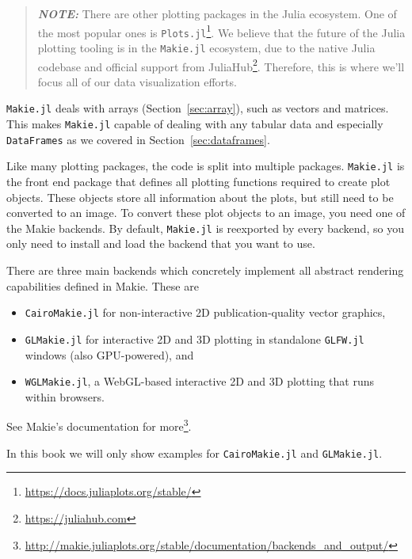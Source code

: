 \documentclass[
  notoc %
]{tufte-book}
\DeclareRobustCommand{\href}[2]{#2\footnote{\url{#1}}}
\providecommand{\tightlist}{%
  \setlength{\itemsep}{0pt}\setlength{\parskip}{0pt}
}
\newcommand{\passthrough}[1]{#1}
\begin{document}
\begin{quote}
\textbf{\emph{NOTE:}} There are other plotting packages in the Julia
ecosystem. One of the most popular ones is
\href{https://docs.juliaplots.org/stable/}{\passthrough{\lstinline!Plots.jl!}}.
We believe that the future of the Julia plotting tooling is in the
\passthrough{\lstinline!Makie.jl!} ecosystem, due to the native Julia
codebase and official support from
\href{https://juliahub.com}{JuliaHub}. Therefore, this is where we'll
focus all of our data visualization efforts.
\end{quote}

\passthrough{\lstinline!Makie.jl!} deals with arrays
(Section~\ref{sec:array}), such as vectors and matrices. This makes
\passthrough{\lstinline!Makie.jl!} capable of dealing with any tabular
data and especially \passthrough{\lstinline!DataFrames!} as we covered
in Section~\ref{sec:dataframes}.

Like many plotting packages, the code is split into multiple packages.
\passthrough{\lstinline!Makie.jl!} is the front end package that defines
all plotting functions required to create plot objects. These objects
store all information about the plots, but still need to be converted to
an image. To convert these plot objects to an image, you need one of the
Makie backends. By default, \passthrough{\lstinline!Makie.jl!} is
reexported by every backend, so you only need to install and load the
backend that you want to use.

There are three main backends which concretely implement all abstract
rendering capabilities defined in Makie. These are

\begin{itemize}
\tightlist
\item
  \passthrough{\lstinline!CairoMakie.jl!} for non-interactive 2D
  publication-quality vector graphics,
\item
  \passthrough{\lstinline!GLMakie.jl!} for interactive 2D and 3D
  plotting in standalone \passthrough{\lstinline!GLFW.jl!} windows (also
  GPU-powered), and
\item
  \passthrough{\lstinline!WGLMakie.jl!}, a WebGL-based interactive 2D
  and 3D plotting that runs within browsers.
\end{itemize}

\href{http://makie.juliaplots.org/stable/documentation/backends_and_output/}{See
Makie's documentation for more}.

In this book we will only show examples for
\passthrough{\lstinline!CairoMakie.jl!} and
\passthrough{\lstinline!GLMakie.jl!}.
\end{document}
